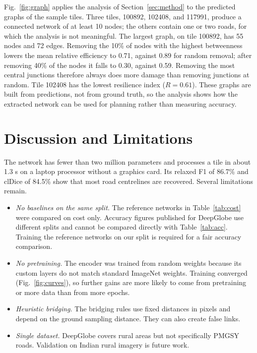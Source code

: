\documentclass{ieeeaccess}
\begin{document}
Fig.~\ref{fig:graph} applies the analysis of Section~\ref{sec:method} to the predicted graphs of the sample tiles. Three tiles, 100892, 102408, and 117991, produce a connected network of at least 10 nodes; the others contain one or two roads, for which the analysis is not meaningful. The largest graph, on tile 100892, has 55 nodes and 72 edges. Removing the 10\% of nodes with the highest betweenness lowers the mean relative efficiency to 0.71, against 0.89 for random removal; after removing 40\% of the nodes it falls to 0.30, against 0.59. Removing the most central junctions therefore always does more damage than removing junctions at random. Tile 102408 has the lowest resilience index ($R = 0.61$). These graphs are built from predictions, not from ground truth, so the analysis shows how the extracted network can be used for planning rather than measuring accuracy.


\section{Discussion and Limitations}
\label{sec:discussion}

The network has fewer than two million parameters and processes a tile in about 1.3 s on a laptop processor without a graphics card. Its relaxed F1 of 86.7\% and clDice of 84.5\% show that most road centrelines are recovered. Several limitations remain.

\begin{itemize}

\item \emph{No baselines on the same split.} The reference networks in Table~\ref{tab:cost} were compared on cost only. Accuracy figures published for DeepGlobe use different splits and cannot be compared directly with Table~\ref{tab:acc}. Training the reference networks on our split is required for a fair accuracy comparison.

\item \emph{No pretraining.} The encoder was trained from random weights because its custom layers do not match standard ImageNet weights. Training converged (Fig.~\ref{fig:curves}), so further gains are more likely to come from pretraining or more data than from more epochs.

\item \emph{Heuristic bridging.} The bridging rules use fixed distances in pixels and depend on the ground sampling distance. They can also create false links.

\item \emph{Single dataset.} DeepGlobe covers rural areas but not specifically PMGSY roads. Validation on Indian rural imagery is future work.

\end{itemize}
\end{document}
